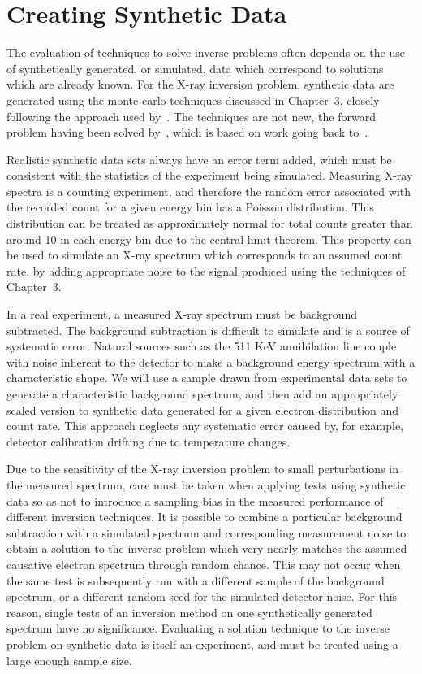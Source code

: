 \section{Creating Synthetic Data}

The evaluation of techniques to solve inverse problems often depends on the use of synthetically generated, or simulated, data which correspond to solutions which are already known. For the X-ray inversion problem, synthetic data are generated using the monte-carlo techniques discussed in Chapter~3, closely following the approach used by~\citep{Xu2019}. The techniques are not new, the forward problem having been solved by~\citep{Berger1972}, which is based on work going back to~\citep{Rees1963}. 

Realistic synthetic data sets always have an error term added, which must be consistent with the statistics of the experiment being simulated. Measuring X-ray spectra is a counting experiment, and therefore the random error associated with the recorded count for a given energy bin has a Poisson distribution. This distribution can be treated as approximately normal for total counts greater than around 10 in each energy bin due to the central limit theorem. This property can be used to simulate an X-ray spectrum which corresponds to an assumed count rate, by adding appropriate noise to the signal produced using the techniques of Chapter~3.

In a real experiment, a measured X-ray spectrum must be background subtracted. The background subtraction is difficult to simulate and is a source of systematic error. Natural sources such as the 511 KeV annihilation line couple with noise inherent to the detector to make a background energy spectrum with a characteristic shape. We will use a sample drawn from experimental data sets to generate a characteristic background spectrum, and then add an appropriately scaled version to synthetic data generated for a given electron distribution and count rate. This approach neglects any systematic error caused by, for example, detector calibration drifting due to temperature changes. 

Due to the sensitivity of the X-ray inversion problem to small perturbations in the measured spectrum, care must be taken when applying tests using synthetic data so as not to introduce a sampling bias in the measured performance of different inversion techniques. It is possible to combine a particular background subtraction with a simulated spectrum and corresponding measurement noise to obtain a solution to the inverse problem which very nearly matches the assumed causative electron spectrum through random chance. This may not occur when the same test is subsequently run with a different sample of the background spectrum, or a different random seed for the simulated detector noise. For this reason, single tests of an inversion method on one synthetically generated spectrum have no significance. Evaluating a solution technique to the inverse problem on synthetic data is itself an experiment, and must be treated using a large enough sample size.  

